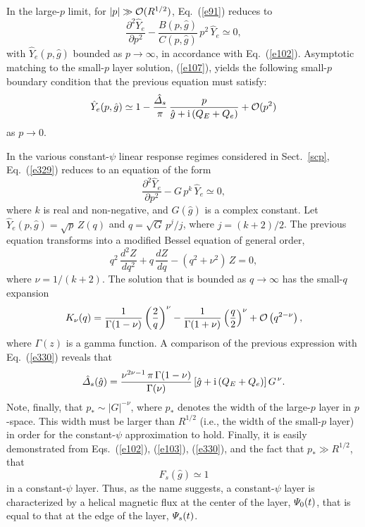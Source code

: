 \documentclass[12pt,prb,aps]{revtex4-1}
\begin{document}
In the large-$p$ limit, for $|p|\gg {\cal O}(R^{1/2})$,  Eq.~(\ref{e91}) reduces to 
\begin{equation}\label{e329}
\frac{\partial^2\hat{Y}_e}{\partial p^2}- \frac{B(p,\hat{g})}{C(p,\hat{g})}\,p^2\,\hat{Y}_e\simeq 0,
\end{equation}
with $\hat{Y}_e(p,\hat{g})$ bounded as $p\rightarrow\infty$, in accordance with Eq.~(\ref{e102}). Asymptotic matching to the small-$p$
layer solution, (\ref{e107}), yields the following small-$p$ boundary condition  that the previous equation must satisfy:
\begin{equation}\label{e330}
\hat{Y}_e(p,\hat{g})\simeq 1-\frac{\hat{\mit\Delta}_s}{\pi}\,\frac{p}{\hat{g}+{\rm i}\,(Q_E+Q_e)} + {\cal O}(p^2)
\end{equation}
as $p\rightarrow 0$. 

In the various constant-$\psi$ linear response regimes considered in Sect.~\ref{scp}, Eq.~(\ref{e329}) reduces to an
equation of the form
\begin{equation}\label{e330a}
\frac{\partial^2\hat{Y}_e}{\partial p^2}- G\,p^k\,\hat{Y}_e\simeq 0,
\end{equation}
where $k$ is real and non-negative, and $G(\hat{g})$ is a complex constant. Let $\hat{Y}_e(p,\hat{g})=\!\sqrt{p}\,Z(q)$ and $q=\!\sqrt{G}\,p^j/j$, where
$j=(k+2)/2$. The previous equation transforms into a modified Bessel equation of general order, 
\begin{equation}
q^2\,\frac{d^2Z}{dq^2} + q\,\frac{dZ}{dq} - (q^2+\nu^2)\,Z =0,
\end{equation}
where $\nu=1/(k+2)$. The solution that is bounded as $q\rightarrow \infty$ has the small-$q$
expansion\,\cite{abram}
\begin{equation}\label{e332}
K_\nu(q)= \frac{1}{{\Gamma}(1-\nu)}\left(\frac{2}{q}\right)^\nu - \frac{1}{{\Gamma}(1+\nu)}\left(\frac{q}{2}\right)^\nu + {\cal O}\left(q^{2-\nu}\right),
\end{equation}
where $\Gamma(z)$ is a gamma function.
A comparison of the previous expression with Eq.~(\ref{e330}) reveals that
\begin{equation}
\hat{\mit\Delta}_s(\hat{g}) =  \frac{\nu^{2\nu-1}\,\pi\,\Gamma(1-\nu)}{\Gamma(\nu)}\left[\hat{g}+{\rm i}\,(Q_E+Q_e)\right]G^{\,\nu}.
\end{equation}
Note, finally, that $p_\ast\sim |G|^{-\nu}$, where $p_\ast$ denotes the width of the large-$p$ layer in $p$-space. This width must be larger than $R^{1/2}$ (i.e., the width of the small-$p$ layer) in order for the constant-$\psi$ approximation to hold.
Finally, it is easily demonstrated from Eqs.~(\ref{e102}), (\ref{e103}), (\ref{e330}), and the fact that $p_\ast \gg R^{1/2}$, that
\begin{equation}\label{efeq1}
F_s(\hat{g})\simeq 1
\end{equation}
in a constant-$\psi$ layer. Thus, as the name suggests, a constant-$\psi$ layer is characterized by a helical
magnetic flux at the center of the layer, ${\mit\Psi}_0(t)$, that is equal to that at the edge of the layer, ${\mit\Psi}_s(t)$. 
\end{document}
